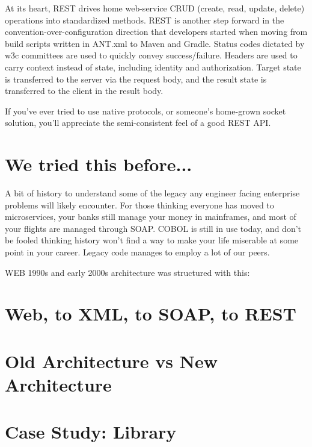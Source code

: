 At its heart, REST drives home web-service CRUD (create, read, update, delete) operations into standardized methods.  REST is another step forward in the convention-over-configuration direction that developers started when moving from build scripts written in ANT.xml to Maven and Gradle.  Status codes dictated by w3c committees are used to quickly convey success/failure.  Headers are used to carry context instead of state, including identity and authorization.  Target state is transferred to the server via the request body, and the result state is transferred to the client in the result body.

If you've ever tried to use native protocols, or someone's home-grown socket solution, you'll appreciate the semi-consistent feel of a good REST API.

\section{We tried this before...}

A bit of history to understand some of the legacy any engineer facing enterprise problems will likely encounter.  For those thinking everyone has moved to microservices, your banks still manage your money in mainframes, and most of your flights are managed through SOAP.  COBOL is still in use today, and don't be fooled thinking history won't find a way to make your life miserable at some point in your career.  Legacy code manages to employ a lot of our peers.

WEB 1990s and early 2000s architecture was structured with this:

\section{Web, to XML, to SOAP, to REST}

\section{Old Architecture vs New Architecture}


\section{Case Study: Library}
